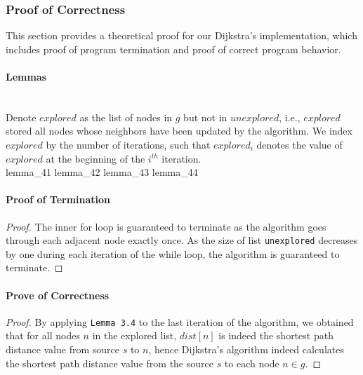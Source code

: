 \subsubsection{Proof of Correctness}
This section provides a theoretical proof for our Dijkstra's implementation, which includes proof of program termination and proof of correct program behavior.

\paragraph{Lemmas}
\tab\\
Denote $explored$ as the list of nodes in $g$ but not in $unexplored$, i.e., $explored$ stored all nodes whose neighbors have been updated by the algorithm. We index $explored$ by the number of iterations, such that $explored_i$ denotes the value of $explored$ at the beginning of the $i^{th}$ iteration.
\tab\\
{lemma_41}
{lemma_42}
{lemma_43}
{lemma_44}

\paragraph{Proof of Termination} 
\begin{proof}
The inner for loop is guaranteed to terminate as the algorithm goes through each adjacent node exactly once. As the size of list \texttt{unexplored} decreases by one during each iteration of the while loop, the algorithm is guaranteed to terminate. 
\end{proof}

\paragraph{Prove of Correctness}
\begin{proof}
By applying \texttt{Lemma 3.4} to the last iteration of the algorithm, we obtained that for all nodes $n$ in the explored list, $dist[n]$ is indeed the shortest path distance value from source $s$ to $n$, hence Dijkstra's algorithm indeed calculates the shortest path distance value from the source $s$ to each node $n \in g$. 
\end{proof}